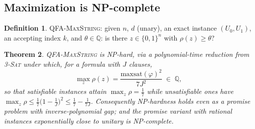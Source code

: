\documentclass[11pt]{amsart}
\newtheorem{theorem}{Theorem}[section]
\theoremstyle{definition}
\newtheorem{definition}[theorem]{Definition}
\theoremstyle{remark}
\newcommand{\Q}{\mathbb{Q}}
\begin{document}
\subsection*{Maximization is NP-complete}

\begin{definition}
\textup{\textsc{QFA-MaxString}}: given $n$, $d$ (unary), an exact instance
$(U_0,U_1)$, an accepting index $k$, and $\theta\in\Q$: is there
$z\in\{0,1\}^n$ with $\rho(z)\ge\theta$?
\end{definition}

\begin{theorem}\label{thm:nphard}
\textup{\textsc{QFA-MaxString}} is NP-hard, via a polynomial-time reduction
from \textup{\textsc{3-Sat}} \cite{GJ79} under which, for a formula with $J$
clauses,
\[
  \max_{z}\rho(z)=\frac{\mathrm{maxsat}(\varphi)^2}{7J^2}
  \;\in\;\Q ,
\]
so that satisfiable instances attain $\max_z\rho=\frac17$ while
unsatisfiable ones have
$\max_z\rho\le\frac17\bigl(1-\frac1J\bigr)^2
\le\frac17-\frac1{7J}$. Consequently NP-hardness holds even as a
promise problem with inverse-polynomial gap; and the promise variant
with rational instances exponentially close to unitary is
NP-complete.
\end{theorem}
\end{document}
